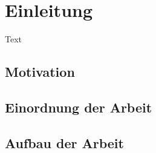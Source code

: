 \chapter{Einleitung}
\label{chap:01_einleitung}

   Text

   \section{Motivation}
   \label{sec:01_motivation}

      
   \section{Einordnung der Arbeit}
   \label{sec:01_einordnung}

      
   \section{Aufbau der Arbeit}
   \label{sec:01_aufbau}
